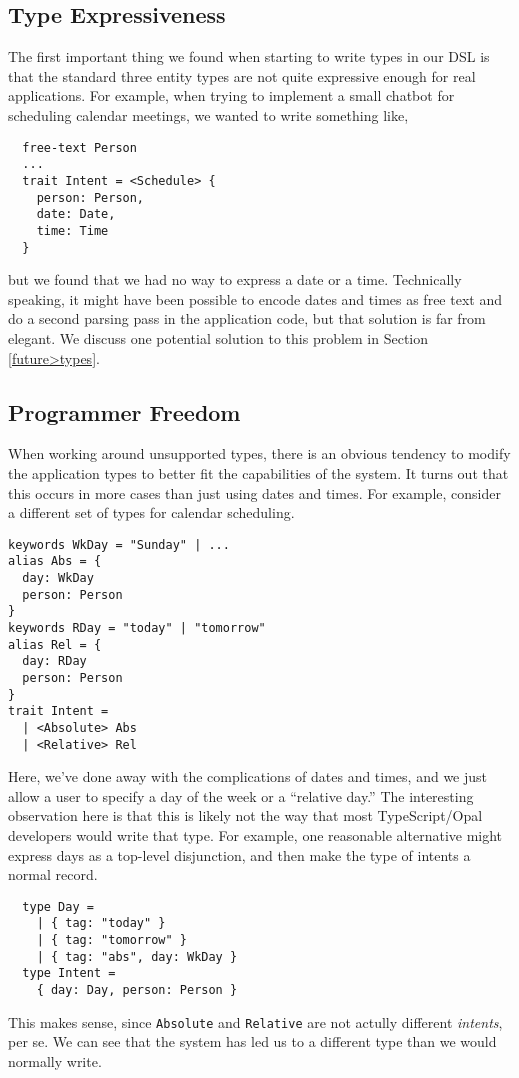 \documentclass[twocolumn]{article}
\newcommand{\ts}[1]{\texttt{#1}}
\begin{document}
\subsection{Type Expressiveness}
The first important thing we found when starting to write types in our DSL is
that the standard three entity types are not quite expressive enough for real
applications. For example, when trying to implement a small chatbot for
scheduling calendar meetings, we wanted to write something like,
\begin{verbatim}
  free-text Person
  ...
  trait Intent = <Schedule> {
    person: Person,
    date: Date,
    time: Time
  }
\end{verbatim}
but we found that we had no way to express a date or a time. Technically
speaking, it might have been possible to encode dates and times as free text and
do a second parsing pass in the application code, but that solution is far from
elegant. We discuss one potential solution to this problem in Section
\ref{future>types}.

\subsection{Programmer Freedom}
When working around unsupported types, there is an obvious tendency to modify
the application types to better fit the capabilities of the system. It turns out
that this occurs in more cases than just using dates and times. For example,
consider a different set of types for calendar scheduling.
\begin{verbatim}
keywords WkDay = "Sunday" | ...
alias Abs = {
  day: WkDay
  person: Person
}
keywords RDay = "today" | "tomorrow"
alias Rel = {
  day: RDay
  person: Person
}
trait Intent =
  | <Absolute> Abs
  | <Relative> Rel
\end{verbatim}
Here, we've done away with the complications of dates and times, and we just
allow a user to specify a day of the week or a ``relative day.'' The interesting
observation here is that this is likely not the way that most TypeScript/Opal
developers would write that type. For example, one reasonable alternative might
express days as a top-level disjunction, and then make the type of intents a
normal record.
\begin{verbatim}
  type Day =
    | { tag: "today" }
    | { tag: "tomorrow" }
    | { tag: "abs", day: WkDay }
  type Intent =
    { day: Day, person: Person }
\end{verbatim}
This makes sense, since \ts{Absolute} and \ts{Relative} are not actully
different \emph{intents}, per se. We can see that the system has led us to a
different type than we would normally write.
\end{document}
